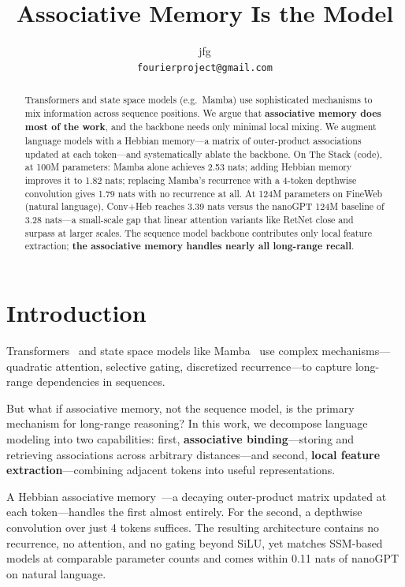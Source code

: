 \documentclass{article}
\title{Associative Memory Is the Model}
\author{
  jfg \\
  \texttt{fourierproject@gmail.com}
}
\begin{document}
\maketitle

\begin{abstract}
Transformers and state space models (e.g.\ Mamba) use sophisticated mechanisms to mix information across sequence positions. We argue that \textbf{associative memory does most of the work}, and the backbone needs only minimal local mixing. We augment language models with a Hebbian memory---a matrix of outer-product associations updated at each token---and systematically ablate the backbone. On The Stack (code), at 100M parameters: Mamba alone achieves 2.53 nats; adding Hebbian memory improves it to 1.82 nats; replacing Mamba's recurrence with a 4-token depthwise convolution gives 1.79 nats with no recurrence at all. At 124M parameters on FineWeb (natural language), Conv+Heb reaches 3.39 nats versus the nanoGPT 124M baseline of 3.28 nats---a small-scale gap that linear attention variants like RetNet close and surpass at larger scales. The sequence model backbone contributes only local feature extraction; \textbf{the associative memory handles nearly all long-range recall}.
\end{abstract}

\section{Introduction}

Transformers~\citep{vaswani2017attention} and state space models like Mamba~\citep{gu2024mamba,dao2024mamba2} use complex mechanisms---quadratic attention, selective gating, discretized recurrence---to capture long-range dependencies in sequences.

But what if associative memory, not the sequence model, is the primary mechanism for long-range reasoning? In this work, we decompose language modeling into two capabilities: first, \textbf{associative binding}---storing and retrieving associations across arbitrary distances---and second, \textbf{local feature extraction}---combining adjacent tokens into useful representations.

A Hebbian associative memory~\citep{hebb1949organization}---a decaying outer-product matrix updated at each token---handles the first almost entirely. For the second, a depthwise convolution over just 4 tokens suffices. The resulting architecture contains no recurrence, no attention, and no gating beyond SiLU, yet matches SSM-based models at comparable parameter counts and comes within 0.11 nats of nanoGPT on natural language.
\end{document}
